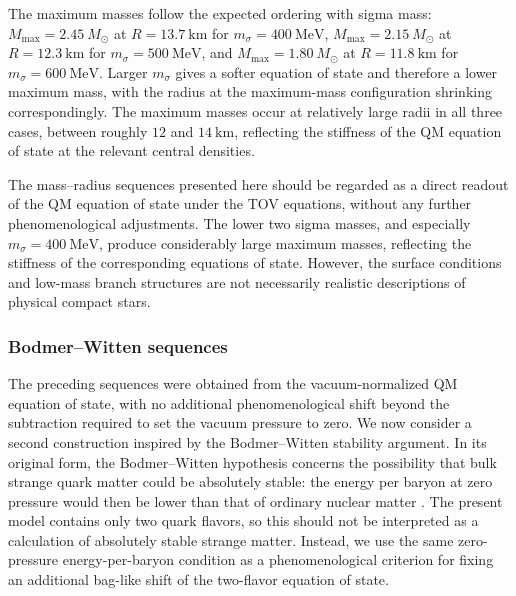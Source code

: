 The maximum masses follow the expected ordering with sigma mass:
\(M_{\max} = 2.45~M_\odot\) at \(R = 13.7~\mathrm{km}\) for
\(m_\sigma = 400~\mathrm{MeV}\),
\(M_{\max} = 2.15~M_\odot\) at \(R = 12.3~\mathrm{km}\) for
\(m_\sigma = 500~\mathrm{MeV}\), and
\(M_{\max} = 1.80~M_\odot\) at \(R = 11.8~\mathrm{km}\) for
\(m_\sigma = 600~\mathrm{MeV}\). Larger \(m_\sigma\) gives a softer
equation of state and therefore a lower maximum mass, with the radius
at the maximum-mass configuration shrinking correspondingly. The
maximum masses occur at relatively large radii in all three cases,
between roughly \(12\) and \(14~\mathrm{km}\), reflecting the
stiffness of the QM equation of state at the relevant central
densities.

The mass--radius sequences presented here should be regarded as a
direct readout of the QM equation of state under the TOV equations,
without any further phenomenological adjustments. The lower two sigma
masses, and especially \(m_\sigma = 400~\mathrm{MeV}\), produce
considerably large maximum masses, reflecting the stiffness of the
corresponding equations of state. However, the surface conditions and
low-mass branch structures are not necessarily realistic descriptions of
physical compact stars.

\subsubsection*{Bodmer--Witten sequences}

The preceding sequences were obtained from the vacuum-normalized QM
equation of state, with no additional phenomenological shift beyond the
subtraction required to set the vacuum pressure to zero. We now consider
a second construction inspired by the Bodmer--Witten stability argument.
In its original form, the Bodmer--Witten hypothesis concerns the
possibility that bulk strange quark matter could be absolutely stable:
the energy per baryon at zero pressure would then be lower than that of
ordinary nuclear matter \cite{Bodmer1971,Witten1984,FarhiJaffe1984}.
The present model contains only two quark flavors, so this should not be
interpreted as a calculation of absolutely stable strange matter.
Instead, we use the same zero-pressure energy-per-baryon condition as a
phenomenological criterion for fixing an additional bag-like shift of
the two-flavor equation of state.

